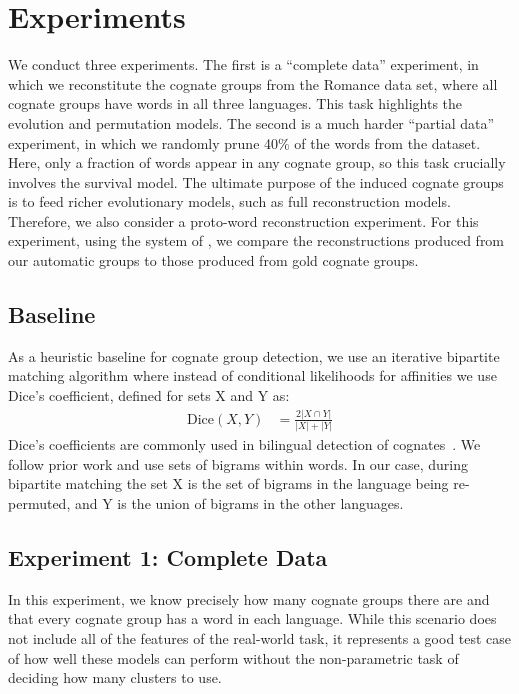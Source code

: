 \documentclass[11pt,a4paper]{article}
\begin{document}
\section{Experiments}

We conduct three experiments. The first is a ``complete data''
experiment, in which we reconstitute the cognate groups from the
Romance data set, where all cognate groups have words in all three
languages.  This task highlights the evolution and permutation
models.  The second is a much harder ``partial data'' experiment,
in which we randomly prune 40\% of the words from the dataset.
Here, only a fraction of words appear in any cognate group,
so this task crucially involves the survival model.  The ultimate
purpose of the induced cognate groups is to feed richer evolutionary
models, such as full reconstruction models.  Therefore, we also
consider a proto-word reconstruction experiment.  For this experiment,
using the system of , we compare the
reconstructions produced from our automatic groups to those produced
from gold cognate groups.

\subsection{Baseline}
\label{sec:baseline}

As a heuristic baseline for cognate group detection, we use an iterative
bipartite matching algorithm where instead of conditional likelihoods
for affinities we use Dice's coefficient, defined for sets X and
Y as:
\begin{equation}
  \begin{split}
    \mathrm{Dice}(X,Y) &= \frac{2 |X\cap Y|}{|X| + |Y|}
   \end{split}
 \end{equation}
Dice's coefficients are commonly used in bilingual detection of
cognates~\cite{Kondrak01identifyingcognates,Kondrak03cognatescan}. We
follow prior work and use sets of bigrams within words. In our case,
during bipartite matching the set X is the set of bigrams in the
language being re-permuted, and Y is the union of bigrams in the other languages.

\subsection{Experiment 1: Complete Data}

In this experiment, we know precisely how many cognate groups there
are and that every cognate group has a word in each language. While
this scenario does not include all of the features of the real-world
task, it represents a good test case of how well these models can
perform without the non-parametric task of deciding how many clusters
to use.
\end{document}
